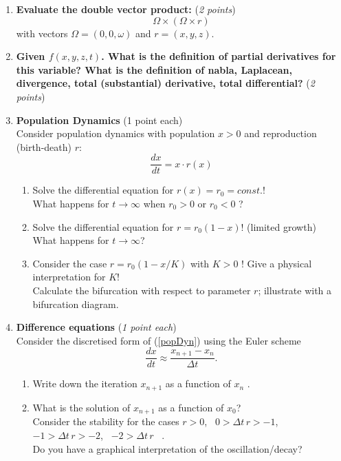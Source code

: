 \documentclass[a4paper,12pt]{article}
\begin{document}
\begin{enumerate}
\begin{enumerate}
\end{enumerate}
\vspace{1cm}
  \item \textbf{Evaluate the double vector product:} (\textit{2 points})
$$ \Omega \times ( \Omega \times r ) $$
with vectors $\Omega=(0,0,\omega)$ and $r=(x,y,z)$.

  \item \textbf{Given $f(x,y,z,t)$. What is the definition of partial derivatives for this variable?
What is the definition of nabla, Laplacean, divergence, total (substantial) derivative, total differential?} (\textit{2 points})

\item {\bf Population Dynamics} (1 point each)\\
 Consider population dynamics with population $x > 0 $ and reproduction (birth-death) $ r $:
      \begin{equation}
          \frac{dx}{dt} = x \cdot r(x) \label{popDyn}
      \end{equation}
      \begin{enumerate}
 \item
      Solve the differential equation for $r(x)=r_0=const.$!\\
      What happens for $t \to \infty $ when $r_0 > 0$ or $r_0 < 0$ ?\\
 \item
      Solve the differential equation for $r=r_0 (1-x) $! (limited
      growth)\\
 What
      happens for $t \to \infty $?\\
 \item
      Consider the case $r=r_0 (1-x/K) $ with $K>0$ ! Give a physical
      interpretation for $ K $! \\
      Calculate the bifurcation with respect to parameter $r$;
      illustrate with a bifurcation diagram.

      \end{enumerate}

 \item
      {\bf Difference equations} (\textit{1 point each})\\
 Consider the discretised form of (\ref{popDyn}) using the Euler scheme
 \begin{equation}
      \frac{dx}{dt} \approx \frac{x_{n+1}-x_n}{\Delta t}.
 \end{equation}

      \begin{enumerate}
 \item
      Write down the iteration $x_{n+1}$ as a function of $x_{n}$ .\\
 \item
      What is the solution of $x_{n+1}$ as a function of $x_{0}$?\\
 Consider
      the stability for the cases $r>0$, \, $0 > \Delta t \, r
      > -1$, \, $ -1 > \Delta t \, r > -2$, \, $ -2 > \Delta
      t \, r$ \, . \\
 Do you
      have a graphical interpretation of the oscillation/decay?\\


\end{enumerate}
\end{enumerate}
\end{document}

